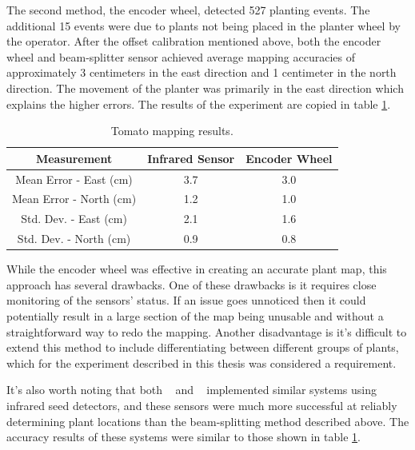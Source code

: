 The second method, the encoder wheel, detected 527 planting events.  The additional 15 events were due to plants not being placed in the planter wheel by the operator.  After the offset calibration mentioned above, both the encoder wheel and beam-splitter sensor achieved average mapping accuracies of approximately 3 centimeters in the east direction and 1 centimeter in the north direction.  The movement of the planter was primarily in the east direction which explains the higher errors.  The results of the experiment are copied in table \ref{table:tomato_results}.  

\begin{table}
    \begin{center}
    \caption[Tomato mapping results]{Tomato mapping results.}
    \begin{tabular}[c]{|c|c|c|}
        \hline
        Measurement & Infrared Sensor & Encoder Wheel \\
        \hline
        Mean Error - East (cm)   & 3.7       &  3.0    \\
        Mean Error - North (cm)  & 1.2       & 1.0     \\
        Std. Dev. - East (cm)    & 2.1       & 1.6     \\
        Std. Dev. - North (cm)   & 0.9       & 0.8     \\
        \hline
    \end{tabular}
    \label{table:tomato_results}
   \end{center}
\end{table} 
          
While the encoder wheel was effective in creating an accurate plant map, this approach has several drawbacks. One of these drawbacks is it requires close monitoring of the sensors' status. If an issue goes unnoticed then it could potentially result in a large section of the map being unusable and without a straightforward way to redo the mapping. Another disadvantage is it's difficult to extend this method to include differentiating between different groups of plants, which for the experiment described in this thesis was considered a requirement.
          
It's also worth noting that both ~\citep{Nørremark:2007} and ~\citep{Ehsani:2004} implemented similar systems using infrared seed detectors, and these sensors were much more successful at reliably determining plant locations than the beam-splitting method described above.  The accuracy results of these systems were similar to those shown in table \ref{table:tomato_results}.
          

